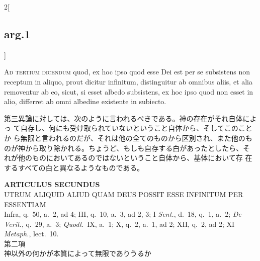 \documentclass[paper=a4paper,fontsize=10pt,jafontsize=9pt,titlepage]{jlreq}
\begin{document}
\begin{paracol}{2}[\subsection{arg.1}]
\switchcolumn*[\subsection{ad.3}]

{\scshape Ad tertium dicendum} quod, ex hoc ipso quod esse Dei est per se
subsistens non receptum in aliquo, prout dicitur infinitum, distinguitur
ab omnibus aliis, et alia removentur ab eo, sicut, si esset albedo
subsistens, ex hoc ipso quod non esset in alio, differret ab omni
albedine existente in subiecto.

\switchcolumn

第三異論に対しては、次のように言われるべきである。神の存在がそれ自体によっ
 て自存し、何にも受け取られていないということ自体から、そしてこのことか
 ら無限と言われるのだが、それは他の全てのものから区別され、また他のも
 のが神から取り除かれる。ちょうど、もしも自存する白があったとしたら、そ
 れが他のものにおいてあるのではないということ自体から、基体において存
 在するすべての白と異なるようなものである。

\end{paracol}
\newpage
{}


\begin{center}
 {\Large {\bfseries ARTICULUS SECUNDUS}}\\
 {\large UTRUM ALIQUID ALIUD QUAM DEUS POSSIT ESSE INFINITUM PER ESSENTIAM}\\
 {\footnotesize Infra, q.~50, a.~2, ad 4; III, q.~10, a.~3, ad 2, 3; I
 {\itshape Sent.}, d.~18, q.~1, a.~2; {\itshape De Verit.}, q.~29, a.~3;
 {\itshape Quodl.}~IX, a.~1; X, q.~2, a.~1, ad 2; XII, q.~2, ad 2; XI
 {\itshape Metaph.}, lect.~10.}\\
 {\Large 第二項\\神以外の何かが本質によって無限でありうるか}
\end{center}

{}
\setcounter{section}{2}
\setcounter{subsection}{0}
\end{document}
